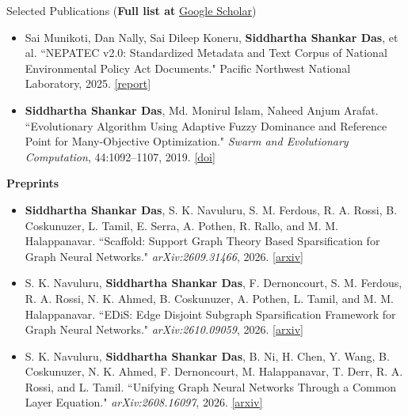 \documentclass{resume} %
\begin{document}
\begin{rSection}{Selected Publications (\textbf{Full list at } \href{https://scholar.google.com/citations?user=kTAFl2yYe6QC&hl=en}{Google Scholar})}
\begin{itemize}
    \item Sai Munikoti, Dan Nally, Sai Dileep Koneru, \textbf{Siddhartha Shankar Das}, et al. ``NEPATEC v2.0: Standardized Metadata and Text Corpus of National Environmental Policy Act Documents." Pacific Northwest National Laboratory, 2025. \href{https://www.pnnl.gov/publications/nepatec-v20-standardized-metadata-and-text-corpus-national-environmental-policy-act}{[report]}

    \item \textbf{Siddhartha Shankar Das}, Md. Monirul Islam, Naheed Anjum Arafat. ``Evolutionary Algorithm Using Adaptive Fuzzy Dominance and Reference Point for Many-Objective Optimization." \textit{Swarm and Evolutionary Computation}, 44:1092--1107, 2019. \href{https://doi.org/10.1016/j.swevo.2018.11.003}{[doi]}
\end{itemize}

\textbf{Preprints}
\begin{itemize}

    \item \textbf{Siddhartha Shankar Das}, S. K. Navuluru, S. M. Ferdous, R. A. Rossi, B. Coskunuzer, L. Tamil, E. Serra, A. Pothen, R. Rallo, and M. M. Halappanavar. ``Scaffold: Support Graph Theory Based Sparsification for Graph Neural Networks." \textit{arXiv:2609.31466}, 2026. \href{https://arxiv.org/abs/2609.31466}{[arxiv]}

    \item S. K. Navuluru, \textbf{Siddhartha Shankar Das}, F. Dernoncourt, S. M. Ferdous, R. A. Rossi, N. K. Ahmed, B. Coskunuzer, A. Pothen, L. Tamil, and M. M. Halappanavar. ``EDiS: Edge Disjoint Subgraph Sparsification Framework for Graph Neural Networks." \textit{arXiv:2610.09059}, 2026. \href{https://arxiv.org/abs/2610.09059}{[arxiv]}

    \item S. K. Navuluru, \textbf{Siddhartha Shankar Das}, B. Ni, H. Chen, Y. Wang, B. Coskunuzer, N. K. Ahmed, F. Dernoncourt, M. Halappanavar, T. Derr, R. A. Rossi, and L. Tamil. ``Unifying Graph Neural Networks Through a Common Layer Equation." \textit{arXiv:2608.16097}, 2026. \href{https://arxiv.org/abs/2608.16097}{[arxiv]}

\end{itemize}
\end{rSection}
\end{document}
